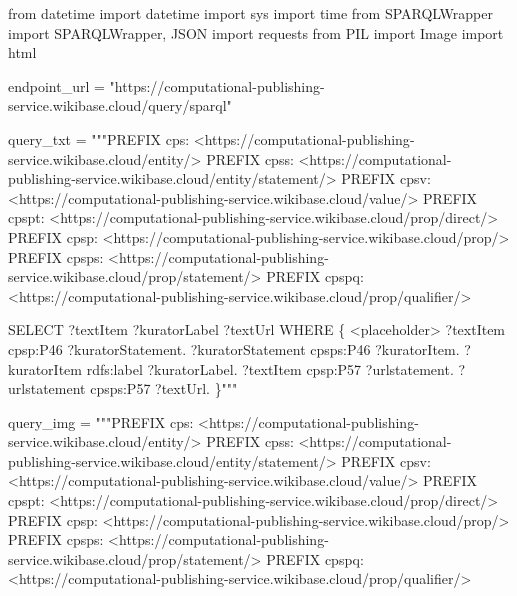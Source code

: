 \documentclass[
  a4paper,
]{book}
\newenvironment{Shaded}{\begin{snugshade}}{\end{snugshade}}
\newcommand{\ImportTok}[1]{\textcolor[rgb]{0.00,0.46,0.62}{#1}}
\newcommand{\NormalTok}[1]{\textcolor[rgb]{0.00,0.23,0.31}{#1}}
\newcommand{\OperatorTok}[1]{\textcolor[rgb]{0.37,0.37,0.37}{#1}}
\newcommand{\StringTok}[1]{\textcolor[rgb]{0.13,0.47,0.30}{#1}}
\begin{document}
\begin{Shaded}
\begin{Highlighting}[]
\ImportTok{from}\NormalTok{ datetime }\ImportTok{import}\NormalTok{ datetime}
\ImportTok{import}\NormalTok{ sys}
\ImportTok{import}\NormalTok{ time}
\ImportTok{from}\NormalTok{ SPARQLWrapper }\ImportTok{import}\NormalTok{ SPARQLWrapper, JSON}
\ImportTok{import}\NormalTok{ requests}
\ImportTok{from}\NormalTok{ PIL }\ImportTok{import}\NormalTok{ Image}
\ImportTok{import}\NormalTok{ html}

\NormalTok{endpoint\_url }\OperatorTok{=} \StringTok{"https://computational{-}publishing{-}service.wikibase.cloud/query/sparql"}

\NormalTok{query\_txt }\OperatorTok{=} \StringTok{"""PREFIX cps: \textless{}https://computational{-}publishing{-}service.wikibase.cloud/entity/\textgreater{}}
\StringTok{PREFIX cpss: \textless{}https://computational{-}publishing{-}service.wikibase.cloud/entity/statement/\textgreater{}}
\StringTok{PREFIX cpsv: \textless{}https://computational{-}publishing{-}service.wikibase.cloud/value/\textgreater{}}
\StringTok{PREFIX cpspt: \textless{}https://computational{-}publishing{-}service.wikibase.cloud/prop/direct/\textgreater{}}
\StringTok{PREFIX cpsp: \textless{}https://computational{-}publishing{-}service.wikibase.cloud/prop/\textgreater{}}
\StringTok{PREFIX cpsps: \textless{}https://computational{-}publishing{-}service.wikibase.cloud/prop/statement/\textgreater{}}
\StringTok{PREFIX cpspq: \textless{}https://computational{-}publishing{-}service.wikibase.cloud/prop/qualifier/\textgreater{}}

\StringTok{SELECT ?textItem ?kuratorLabel ?textUrl}
\StringTok{WHERE}
\StringTok{\{}
\StringTok{  \textless{}placeholder\textgreater{}}
\StringTok{  ?textItem cpsp:P46 ?kuratorStatement. }
\StringTok{  ?kuratorStatement cpsps:P46 ?kuratorItem. }
\StringTok{  ?kuratorItem rdfs:label ?kuratorLabel.}
\StringTok{  ?textItem cpsp:P57 ?urlstatement. }
\StringTok{  ?urlstatement cpsps:P57 ?textUrl. }
\StringTok{\}"""}

\NormalTok{query\_img }\OperatorTok{=} \StringTok{"""PREFIX cps: \textless{}https://computational{-}publishing{-}service.wikibase.cloud/entity/\textgreater{}}
\StringTok{PREFIX cpss: \textless{}https://computational{-}publishing{-}service.wikibase.cloud/entity/statement/\textgreater{}}
\StringTok{PREFIX cpsv: \textless{}https://computational{-}publishing{-}service.wikibase.cloud/value/\textgreater{}}
\StringTok{PREFIX cpspt: \textless{}https://computational{-}publishing{-}service.wikibase.cloud/prop/direct/\textgreater{}}
\StringTok{PREFIX cpsp: \textless{}https://computational{-}publishing{-}service.wikibase.cloud/prop/\textgreater{}}
\StringTok{PREFIX cpsps: \textless{}https://computational{-}publishing{-}service.wikibase.cloud/prop/statement/\textgreater{}}
\StringTok{PREFIX cpspq: \textless{}https://computational{-}publishing{-}service.wikibase.cloud/prop/qualifier/\textgreater{}}


\end{Highlighting}
\end{Shaded}
\end{document}

